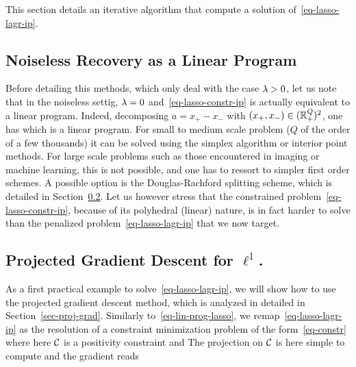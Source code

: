 This section details an iterative algorithm that compute a solution of~\eqref{eq-lasso-lagr-ip}.

\subsection{Noiseless Recovery as a Linear Program}
\label{eq-linearprog-lasso}

Before detailing this methods, which only deal with the case $\lambda>0$, let us note that in the noiseless settig, $\lambda=0$ and~\eqref{eq-lasso-constr-ip} is actually equivalent to a linear program. Indeed, decomposing $a=x_+-x_-$ with $(x_+,x_-) \in (\mathbb{R}_+^Q)^2$, one has
which is a linear program. For small to medium scale problem ($Q$ of the order of a few thousands) it can be solved using the simplex algorithm or interior point methods. 
%
For large scale problems such as those encountered in imaging or machine learning, this is not possible, and one has to ressort to simpler first order schemes. A possible option is the Douglas-Rachford splitting scheme, which is detailed in Section~\ref{}.
%
Let us however stress that the constrained problem~\eqref{eq-lasso-constr-ip}, because of its polyhedral (linear) nature, is in fact harder to solve than the penalized problem~\eqref{eq-lasso-lagr-ip} that we now target. 


\subsection{Projected Gradient Descent for $\ell^1$.}

As a first practical example to solve~\eqref{eq-lasso-lagr-ip}, we will show how to use the projected gradient descent method, which is analyzed in detailed in Section~\ref{sec-proj-grad}.
%
Similarly to~\eqref{eq-lin-prog-lasso}, we remap~\eqref{eq-lasso-lagr-ip} as the resolution of a constraint minimization problem of the form~\eqref{eq-constr} where here $\mathcal{C}$ is a positivity constraint and
The projection on $\mathcal{C}$ is here simple to compute
and the gradient reads

